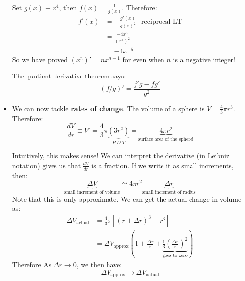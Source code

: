 \begin{itemize}
\begin{example}
        Set $g(x)\equiv x^4$, then $f(x)=\frac{1}{g(x)}$. Therefore:
        \begin{align}
            f'(x)&=-\frac{g'(x)}{g(x)^2} &\text{reciprocal LT} \\ 
            &= \frac{-4x^3}{(x^4)^2} \\ 
            &= -4x^{-5}
        \end{align}
        So we have proved $(x^n)'=nx^{n-1}$ for even when $n$ is a negative integer!
    \end{example}
    \begin{theorem}
        The quotient derivative theorem says:
        \begin{equation}
            (f/g)'=\frac{f'g-fg'}{g^2}
            \label{eq:}
        \end{equation} 
    \end{theorem}
    \item We can now tackle \textbf{rates of change}. The volume of a sphere is $V=\frac{4}{3}\pi r^3$. Therefore:
    \begin{equation}
        \frac{dV}{dr} \equiv V' = \frac{4}{3}\pi \underbrace{(3r^2)}_{P.D.T} = \underbrace{4\pi r^2}_\text{surface area of the sphere!}
        \label{eq:}
    \end{equation}
    \begin{idea}
        Intuitively, this makes sense! We can interpret the derivative (in Leibniz notation) gives us that $\frac{dV}{dr}$ is a fraction. If we write it as small increments, then:
        \begin{equation}
            \underbrace{\Delta V}_\text{small increment of volume} \simeq 4\pi r^2 \underbrace{\Delta r}_\text{small increment of radius}
            \label{eq:}
        \end{equation}
        Note that this is only approximate. We can get the actual change in volume as:
        \begin{align}
            \Delta V_\text{actual} &= \frac{4}{3}\pi\left[(r+\Delta r)^3-r^3\right] \\ 
            &= \Delta V_\text{approx}\left(1+\frac{\Delta r}{r}+\underbrace{\frac{1}{3}\left(\frac{\Delta r}{r}\right)^2}_\text{goes to zero}\right)
            \label{eq:}
        \end{align}
        Therefore As $\Delta r \to 0$, we then have:
        \begin{equation}
            \Delta V_\text{approx} \to \Delta V_\text{actual} 
            \label{eq:}
        \end{equation}
    \end{idea}
\end{itemize}
